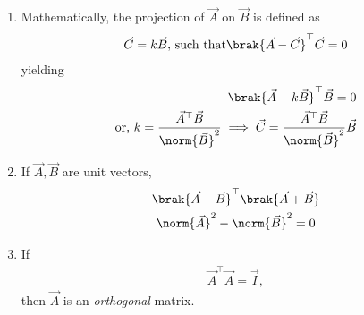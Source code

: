 \begin{enumerate}[label=\thesubsection.\arabic*.,ref=\thesubsection.\theenumi]
	\item Mathematically, 
the projection of $\vec{A}$ on $\vec{B}$ is defined as
		\begin{align}
	\vec{C} = k \vec{B},\, \text{such that}
	\brak{\vec{A}-\vec{C}}^{\top}\vec{C} = 0
\end{align}
yielding
\begin{align}
	\brak{\vec{A}-k\vec{B}}^{\top}\vec{B} = 0
	\\
	\text{or, } k = 
	\frac{\vec{A}^{\top}\vec{B}}{\norm{\vec{B}}^2}
	\implies 
	\vec{C} = 
	\frac{\vec{A}^{\top}\vec{B}}{\norm{\vec{B}}^2}
 \vec{B}
	\label{eq:12/10/3/4/proj}
\end{align}
\item If $\vec{A}, \vec{B}$ are unit vectors, 
\begin{multline}
	\brak{\vec{A}-\vec{B}}^{\top} 
	\brak{\vec{A}+\vec{B}} 
	\\
\norm{\vec{A}}^2 - \norm{\vec{B}}^2
	= 0
	\label{eq:12/10/3/11/unit}
\end{multline}
  \item If 
\begin{align}
	\vec{A}^{\top}\vec{A} =\vec{I},
\label{eq:12/10/3/5/inner}
\end{align}
		then $	\vec{A}$ is an {\em orthogonal} matrix.
\end{enumerate}
